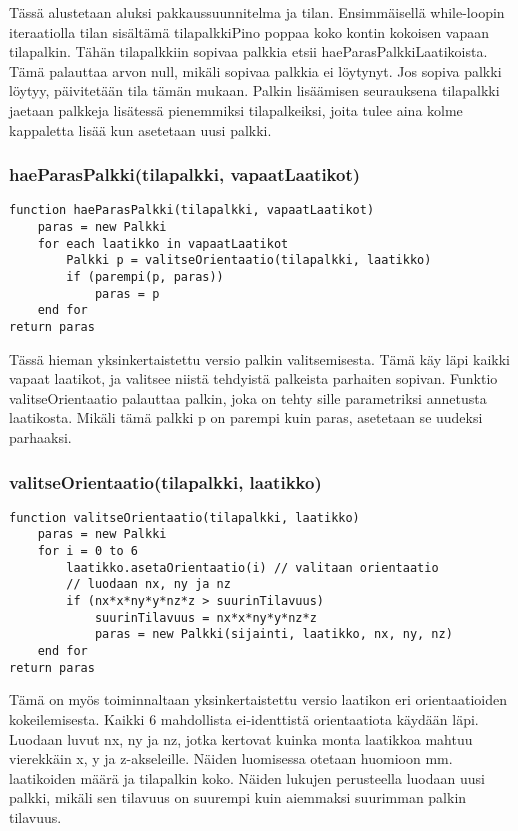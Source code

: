 \documentclass[a4paper,12pt, titlepage]{article}
\begin{document}
\noindent
Tässä alustetaan aluksi pakkaussuunnitelma ja tilan. Ensimmäisellä while-loopin iteraatiolla tilan sisältämä tilapalkkiPino poppaa koko kontin kokoisen vapaan tilapalkin. Tähän tilapalkkiin sopivaa palkkia etsii haeParasPalkkiLaatikoista. Tämä palauttaa arvon null, mikäli sopivaa palkkia ei löytynyt. Jos sopiva palkki löytyy, päivitetään tila tämän mukaan. Palkin lisäämisen seurauksena tilapalkki jaetaan palkkeja lisätessä pienemmiksi tilapalkeiksi, joita tulee aina kolme kappaletta lisää kun asetetaan uusi palkki.

\subsubsection*{haeParasPalkki(tilapalkki, vapaatLaatikot)}

\begin{verbatim}
function haeParasPalkki(tilapalkki, vapaatLaatikot)
    paras = new Palkki
    for each laatikko in vapaatLaatikot
        Palkki p = valitseOrientaatio(tilapalkki, laatikko)
        if (parempi(p, paras))
            paras = p
    end for
return paras
\end{verbatim}

\noindent
Tässä hieman yksinkertaistettu versio palkin valitsemisesta. Tämä käy läpi kaikki vapaat laatikot, ja valitsee niistä tehdyistä palkeista parhaiten sopivan. Funktio valitseOrientaatio palauttaa palkin, joka on tehty sille parametriksi annetusta laatikosta. Mikäli tämä palkki p on parempi kuin paras, asetetaan se uudeksi parhaaksi.

\subsubsection*{valitseOrientaatio(tilapalkki, laatikko)}
\begin{verbatim}
function valitseOrientaatio(tilapalkki, laatikko)
    paras = new Palkki
    for i = 0 to 6
        laatikko.asetaOrientaatio(i) // valitaan orientaatio
        // luodaan nx, ny ja nz
        if (nx*x*ny*y*nz*z > suurinTilavuus)
            suurinTilavuus = nx*x*ny*y*nz*z
            paras = new Palkki(sijainti, laatikko, nx, ny, nz)
    end for
return paras
\end{verbatim}

\noindent
Tämä on myös toiminnaltaan yksinkertaistettu versio laatikon eri orientaatioiden kokeilemisesta. Kaikki 6 mahdollista ei-identtistä orientaatiota käydään läpi. Luodaan luvut nx, ny ja nz, jotka kertovat kuinka monta laatikkoa mahtuu vierekkäin x, y ja z-akseleille. Näiden luomisessa otetaan huomioon mm. laatikoiden määrä ja tilapalkin koko. Näiden lukujen perusteella luodaan uusi palkki, mikäli sen tilavuus on suurempi kuin aiemmaksi suurimman palkin tilavuus.
\end{document}
